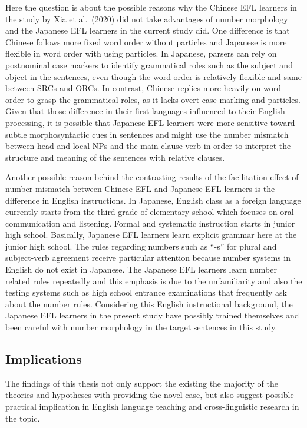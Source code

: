 \documentclass[
]{article}
\begin{document}
Here the question is about the possible reasons why the Chinese EFL
learners in the study by Xia et al.~(2020) did not take advantages of
number morphology and the Japanese EFL learners in the current study
did. One difference is that Chinese follows more fixed word order
without particles and Japanese is more flexible in word order with using
particles. In Japanese, parsers can rely on postnominal case markers to
identify grammatical roles such as the subject and object in the
sentences, even though the word order is relatively flexible and same
between SRCs and ORCs. In contrast, Chinese replies more heavily on word
order to grasp the grammatical roles, as it lacks overt case marking and
particles. Given that those difference in their first languages
influenced to their English processing, it is possible that Japanese EFL
learners were more sensitive toward subtle morphosyntactic cues in
sentences and might use the number mismatch between head and local NPs
and the main clause verb in order to interpret the structure and meaning
of the sentences with relative clauses.

Another possible reason behind the contrasting results of the
facilitation effect of number mismatch between Chinese EFL and Japanese
EFL learners is the difference in English instructions. In Japanese,
English class as a foreign language currently starts from the third
grade of elementary school which focuses on oral communication and
listening. Formal and systematic instruction starts in junior high
school. Basically, Japanese EFL learners learn explicit grammar here at
the junior high school. The rules regarding numbers such as ``-s'' for
plural and subject-verb agreement receive particular attention because
number systems in English do not exist in Japanese. The Japanese EFL
learners learn number related rules repeatedly and this emphasis is due
to the unfamiliarity and also the testing systems such as high school
entrance examinations that frequently ask about the number rules.
Considering this English instructional background, the Japanese EFL
learners in the present study have possibly trained themselves and been
careful with number morphology in the target sentences in this study.

\subsection{Implications}\label{implications}

The findings of this thesis not only support the existing the majority
of the theories and hypotheses with providing the novel case, but also
suggest possible practical implication in English language teaching and
cross-linguistic research in the topic.
\end{document}
